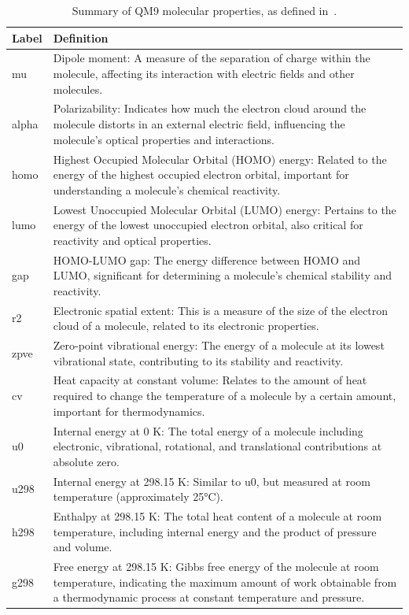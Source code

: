 \begin{table}
\tiny 
\caption{Summary of QM9 molecular properties, as defined in~\cite{Ruddigkeit2012EnumerationGDB-17,Ramakrishnan2015ElectronicSpace}.}
\begin{center}
    \begin{tabular}{ |p{2cm} | p{8cm} |}
    \hline
   \textbf{Label}   &  \textbf{Definition}   \\ \hline\hline
   mu   &   Dipole moment: A measure of the separation of charge within the molecule, affecting its interaction with electric fields and other molecules. \\ \hline
   alpha   &   Polarizability: Indicates how much the electron cloud around the molecule distorts in an external electric field, influencing the molecule's optical properties and interactions. \\ \hline
   homo   &   Highest Occupied Molecular Orbital (HOMO) energy: Related to the energy of the highest occupied electron orbital, important for understanding a molecule's chemical reactivity. \\ \hline
   lumo   &   Lowest Unoccupied Molecular Orbital (LUMO) energy: Pertains to the energy of the lowest unoccupied electron orbital, also critical for reactivity and optical properties. \\ \hline
   gap   &   HOMO-LUMO gap: The energy difference between HOMO and LUMO, significant for determining a molecule's chemical stability and reactivity. \\ \hline
   r2   &   Electronic spatial extent: This is a measure of the size of the electron cloud of a molecule, related to its electronic properties. \\ \hline
   zpve   &   Zero-point vibrational energy: The energy of a molecule at its lowest vibrational state, contributing to its stability and reactivity. \\ \hline
   cv   &   Heat capacity at constant volume: Relates to the amount of heat required to change the temperature of a molecule by a certain amount, important for thermodynamics. \\ \hline
   u0   &   Internal energy at 0 K: The total energy of a molecule including electronic, vibrational, rotational, and translational contributions at absolute zero. \\ \hline
   u298   &   Internal energy at 298.15 K: Similar to u0, but measured at room temperature (approximately 25°C). \\ \hline
   h298   &   Enthalpy at 298.15 K: The total heat content of a molecule at room temperature, including internal energy and the product of pressure and volume. \\ \hline
   g298   &   Free energy at 298.15 K: Gibbs free energy of the molecule at room temperature, indicating the maximum amount of work obtainable from a thermodynamic process at constant temperature and pressure. \\ \hline
    \end{tabular}
    \label{tab:table_QM9}
\end{center}
\end{table}

